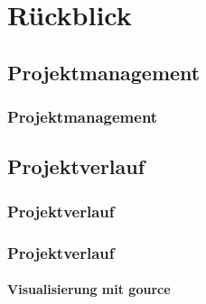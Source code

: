 \section{Rückblick}

\author{Erivn Mazlagi\'c}

\subsection{Projektmanagement}
\begin{frame}
	\frametitle{Projektmanagement\hfill{}\footnotesize \group}
\end{frame}

\subsection{Projektverlauf}
\begin{frame}
	\frametitle{Projektverlauf\hfill{}\footnotesize \group}
\end{frame}

\begin{frame}
	\frametitle{Projektverlauf\hfill{}\footnotesize \group}
	\framesubtitle{Visualisierung mit gource}
\end{frame}
